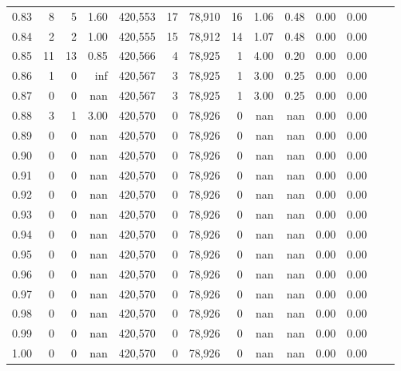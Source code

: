\begin{tabular}{rrrrrrrrrrrrrr}
0.83 &       8 &      5 &    1.60 &  420,553 &       17 &  78,910 &      16 &  1.06 &  0.48 &  0.00 &      0.00 \\
0.84 &       2 &      2 &    1.00 &  420,555 &       15 &  78,912 &      14 &  1.07 &  0.48 &  0.00 &      0.00 \\
0.85 &      11 &     13 &    0.85 &  420,566 &        4 &  78,925 &       1 &  4.00 &  0.20 &  0.00 &      0.00 \\
0.86 &       1 &      0 &     inf &  420,567 &        3 &  78,925 &       1 &  3.00 &  0.25 &  0.00 &      0.00 \\
0.87 &       0 &      0 &     nan &  420,567 &        3 &  78,925 &       1 &  3.00 &  0.25 &  0.00 &      0.00 \\
0.88 &       3 &      1 &    3.00 &  420,570 &        0 &  78,926 &       0 &   nan &   nan &  0.00 &      0.00 \\
0.89 &       0 &      0 &     nan &  420,570 &        0 &  78,926 &       0 &   nan &   nan &  0.00 &      0.00 \\
0.90 &       0 &      0 &     nan &  420,570 &        0 &  78,926 &       0 &   nan &   nan &  0.00 &      0.00 \\
0.91 &       0 &      0 &     nan &  420,570 &        0 &  78,926 &       0 &   nan &   nan &  0.00 &      0.00 \\
0.92 &       0 &      0 &     nan &  420,570 &        0 &  78,926 &       0 &   nan &   nan &  0.00 &      0.00 \\
0.93 &       0 &      0 &     nan &  420,570 &        0 &  78,926 &       0 &   nan &   nan &  0.00 &      0.00 \\
0.94 &       0 &      0 &     nan &  420,570 &        0 &  78,926 &       0 &   nan &   nan &  0.00 &      0.00 \\
0.95 &       0 &      0 &     nan &  420,570 &        0 &  78,926 &       0 &   nan &   nan &  0.00 &      0.00 \\
0.96 &       0 &      0 &     nan &  420,570 &        0 &  78,926 &       0 &   nan &   nan &  0.00 &      0.00 \\
0.97 &       0 &      0 &     nan &  420,570 &        0 &  78,926 &       0 &   nan &   nan &  0.00 &      0.00 \\
0.98 &       0 &      0 &     nan &  420,570 &        0 &  78,926 &       0 &   nan &   nan &  0.00 &      0.00 \\
0.99 &       0 &      0 &     nan &  420,570 &        0 &  78,926 &       0 &   nan &   nan &  0.00 &      0.00 \\
1.00 &       0 &      0 &     nan &  420,570 &        0 &  78,926 &       0 &   nan &   nan &  0.00 &      0.00 \\
\bottomrule
\end{tabular}
